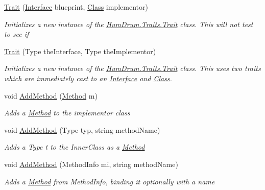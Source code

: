 \begin{DoxyCompactItemize}
\item 
\hyperlink{classHumDrum_1_1Traits_1_1Trait_a190ac07fbda083c60d556d39e5463a06}{Trait} (\hyperlink{classHumDrum_1_1Traits_1_1Interface}{Interface} blueprint, \hyperlink{classHumDrum_1_1Traits_1_1Class}{Class} implementor)
\begin{DoxyCompactList}\small\item\em Initializes a new instance of the \hyperlink{classHumDrum_1_1Traits_1_1Trait}{Hum\+Drum.\+Traits.\+Trait} class. This will not test to see if \end{DoxyCompactList}\item 
\hyperlink{classHumDrum_1_1Traits_1_1Trait_ad2465a9da468106741fd2a58495e0735}{Trait} (Type the\+Interface, Type the\+Implementor)
\begin{DoxyCompactList}\small\item\em Initializes a new instance of the \hyperlink{classHumDrum_1_1Traits_1_1Trait}{Hum\+Drum.\+Traits.\+Trait} class. This uses two traits which are immediately cast to an \hyperlink{classHumDrum_1_1Traits_1_1Interface}{Interface} and \hyperlink{classHumDrum_1_1Traits_1_1Class}{Class}. \end{DoxyCompactList}\item 
void \hyperlink{classHumDrum_1_1Traits_1_1Trait_a41641af3ce5a397fd0371da282e261bf}{Add\+Method} (\hyperlink{classHumDrum_1_1Traits_1_1Method}{Method} m)
\begin{DoxyCompactList}\small\item\em Adds a \hyperlink{classHumDrum_1_1Traits_1_1Method}{Method} to the implementor class \end{DoxyCompactList}\item 
void \hyperlink{classHumDrum_1_1Traits_1_1Trait_a8f2c39015aebfa0eb31149e5c5d04645}{Add\+Method} (Type typ, string method\+Name)
\begin{DoxyCompactList}\small\item\em Adds a Type t to the Inner\+Class as a \hyperlink{classHumDrum_1_1Traits_1_1Method}{Method} \end{DoxyCompactList}\item 
void \hyperlink{classHumDrum_1_1Traits_1_1Trait_a91a98e327a4208ac39a2c610fd6d7bd9}{Add\+Method} (Method\+Info mi, string method\+Name)
\begin{DoxyCompactList}\small\item\em Adds a \hyperlink{classHumDrum_1_1Traits_1_1Method}{Method} from Method\+Info, binding it optionally with a name \end{DoxyCompactList}\item 

\end{DoxyCompactItemize}
